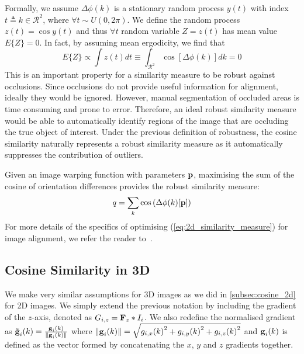 Formally, we assume $\Delta \phi(k)$ is a stationary random process $y(t)$ with
index $t \triangleq k \in \mathcal{R}^2$, where $\forall t \sim U(0, 2\pi)$. We
define the random process $z(t) = \cos{y(t)}$ and thus $\forall t$ random
variable $Z = z(t)$ has mean value $E\{Z\} = 0$. In fact, by assuming mean
ergodicity, we find that
\begin{equation}\label{eq:cosine_integral}
    E\{Z\} \propto \int z(t) dt \equiv \int_{\mathcal{R}^2} \cos[\Delta \phi(k)] dk = 0
\end{equation}
This is an important property for a similarity measure to be robust against
occlusions. Since occlusions do not provide useful information for alignment,
ideally they would be ignored. However, manual segmentation of occluded areas is
time consuming and prone to error. Therefore, an ideal robust similarity measure
would be able to automatically identify regions of the image that are occluding
the true object of interest. Under the previous definition of robustness, the
cosine similarity naturally represents a robust similarity measure as it
automatically suppresses the contribution of outliers.

Given an image warping function with parameters $\boldsymbol{\mathbf{p}}$, maximising the sum
of the cosine of orientation differences provides the robust similarity measure:
\begin{equation}\label{eq:2d_similarity_measure}
    q = \sum_k \cos \left(\Delta \phi(k)[\boldsymbol{\mathbf{p}}]\right)
\end{equation}
For more details of the specifics of optimising (\ref{eq:2d_similarity_measure})
for image alignment, we refer the reader to~\cite{tzimiropoulos2011robust}.
\subsection{Cosine Similarity in 3D}\label{subsec:cosine_3d}
We make very similar assumptions for 3D images as we did in
\cref{subsec:cosine_2d} for 2D images. We simply extend the previous
notation by including the gradient of the $z$-axis, denoted as $G_{i,z} = \boldsymbol{\mathbf{F}}_z \ast I_i$.
We also redefine the normalised gradient as
$\boldsymbol{\mathbf{\tilde{g}}}_{i}(k) = \frac{\boldsymbol{\mathbf{g}}_{i}(k)}{\lVert{} \boldsymbol{\mathbf{g}}_{i}(k) \rVert}$
where $\lVert{} \boldsymbol{\mathbf{g}}_{i}(k) \rVert = \sqrt{{g_{i,x}(k)}^2 + {g_{i,y}(k)}^2 +
{g_{i,z}(k)}^2}$ and $\boldsymbol{\mathbf{g}}_{i}(k)$ is defined as the vector formed by
concatenating the $x$, $y$ and $z$ gradients together.

